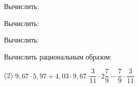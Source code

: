 \begin{homework}[number=1]
	\begin{listofex}
	\item Вычислить:
	\begin{itasks}[1]
		\task {}
		\task {}
	\end{itasks}
	\item Вычислить:
	\begin{itasks}[1]
		\task {}
		\task {}
	\end{itasks}
	\item Вычислить:
	\begin{itasks}[1]
		\task {}
		\task {}
		\task {}
	\end{itasks}
	\item Вычислить рациональным образом:
	\begin{tasks}(2)
		\task \( 9,67\cdot5,97+4,03\cdot9,67 \)
		\task \( \dfrac{3}{11}\cdot2\dfrac{7}{9}-\dfrac{7}{9}\cdot\dfrac{3}{11} \)
	\end{tasks}
	\item {}
	\end{listofex}
\end{homework}

